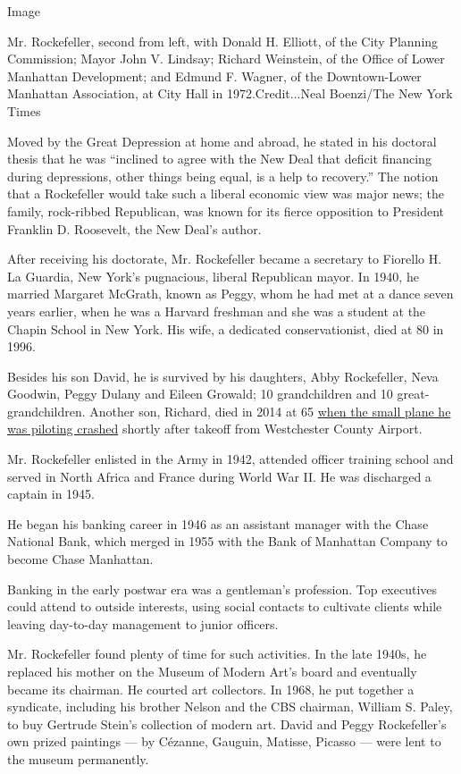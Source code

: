 Image

Mr. Rockefeller, second from left, with Donald H. Elliott, of the City
Planning Commission; Mayor John V. Lindsay; Richard Weinstein, of the
Office of Lower Manhattan Development; and Edmund F. Wagner, of the
Downtown-Lower Manhattan Association, at City Hall in 1972.Credit...Neal
Boenzi/The New York Times

Moved by the Great Depression at home and abroad, he stated in his
doctoral thesis that he was ``inclined to agree with the New Deal that
deficit financing during depressions, other things being equal, is a
help to recovery.'' The notion that a Rockefeller would take such a
liberal economic view was major news; the family, rock-ribbed
Republican, was known for its fierce opposition to President Franklin D.
Roosevelt, the New Deal's author.

After receiving his doctorate, Mr. Rockefeller became a secretary to
Fiorello H. La Guardia, New York's pugnacious, liberal Republican mayor.
In 1940, he married Margaret McGrath, known as Peggy, whom he had met at
a dance seven years earlier, when he was a Harvard freshman and she was
a student at the Chapin School in New York. His wife, a dedicated
conservationist, died at 80 in 1996.

Besides his son David, he is survived by his daughters, Abby
Rockefeller, Neva Goodwin, Peggy Dulany and Eileen Growald; 10
grandchildren and 10 great-grandchildren. Another son, Richard, died in
2014 at 65
\href{https://www.nytimes3xbfgragh.onion/2014/06/14/nyregion/richard-rockefeller-killed-in-new-york-plane-crash.html}{when
the small plane he was piloting crashed} shortly after takeoff from
Westchester County Airport.

Mr. Rockefeller enlisted in the Army in 1942, attended officer training
school and served in North Africa and France during World War II. He was
discharged a captain in 1945.

He began his banking career in 1946 as an assistant manager with the
Chase National Bank, which merged in 1955 with the Bank of Manhattan
Company to become Chase Manhattan.

Banking in the early postwar era was a gentleman's profession. Top
executives could attend to outside interests, using social contacts to
cultivate clients while leaving day-to-day management to junior
officers.

Mr. Rockefeller found plenty of time for such activities. In the late
1940s, he replaced his mother on the Museum of Modern Art's board and
eventually became its chairman. He courted art collectors. In 1968, he
put together a syndicate, including his brother Nelson and the CBS
chairman, William S. Paley, to buy Gertrude Stein's collection of modern
art. David and Peggy Rockefeller's own prized paintings --- by Cézanne,
Gauguin, Matisse, Picasso --- were lent to the museum permanently.

